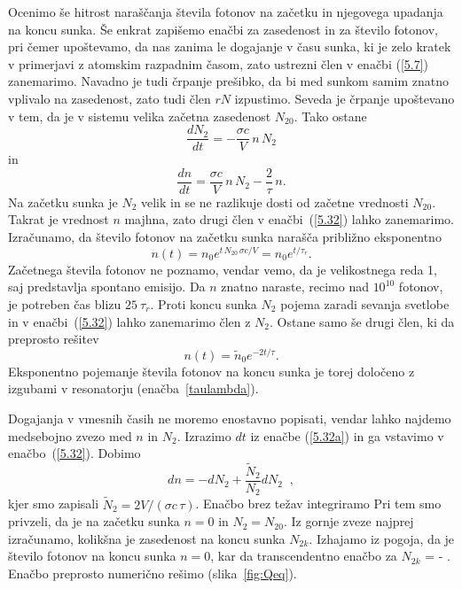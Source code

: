 Ocenimo še hitrost naraščanja števila fotonov na začetku in 
njegovega upadanja na koncu sunka. Še enkrat zapišemo enačbi za zasedenost in za število
fotonov, pri čemer upoštevamo, da nas zanima le dogajanje v času sunka,
ki je zelo kratek v primerjavi z atomskim razpadnim časom, zato 
ustrezni člen v enačbi (\ref{5.7}) zanemarimo. Navadno je tudi črpanje prešibko, da
bi med sunkom samim znatno vplivalo na zasedenost, zato tudi člen $rN$
izpustimo. Seveda je črpanje upoštevano v tem, da je v sistemu velika začetna 
zasedenost $N_{20}$. Tako ostane 
\begin{equation}
 \frac{d N_2}{d t}=-\frac{\sigma c}{V}\,n\,N_2 
 \label{5.32a}
\end{equation}
in 
\begin{equation}
 \frac{d n}{d t}=\frac{\sigma c}{V}\,n\,N_2 - \frac{2}{\tau}\,n.
 \label{5.32}
\end{equation}
Na začetku sunka je $N_2$ velik in se ne razlikuje dosti od začetne vrednosti $N_{20}$. Takrat 
je vrednost  $n$ majhna, zato drugi člen v enačbi~(\ref{5.32}) lahko  
zanemarimo. Izračunamo, da število fotonov
na začetku sunka narašča približno eksponentno
\begin{equation}  
n(t)=n_0e^{t\,N_{20}\,\sigma c/V}= n_0e^{t/\tau_r}.
\label{5.33}
\end{equation}
Začetnega števila fotonov ne poznamo, vendar vemo, da je velikostnega reda 1,
saj predstavlja spontano emisijo. Da $n$ znatno naraste, recimo nad 
$10^{10}$ fotonov, je potreben čas blizu $25~\tau_r$.
Proti koncu sunka $N_2$ pojema zaradi sevanja svetlobe in v enačbi~(\ref{5.32}) lahko 
zanemarimo člen z $N_2$. Ostane samo še drugi člen, ki da preprosto rešitev
\begin{equation}  
n(t)=\tilde{n}_0e^{-2t/\tau}.
\label{5.33a}
\end{equation}
Eksponentno pojemanje števila fotonov na koncu sunka je torej določeno z izgubami
v resonatorju (enačba~\ref{taulambda}). 

Dogajanja v vmesnih časih ne moremo enostavno popisati, vendar lahko najdemo
medsebojno zvezo med $n$ in $N_2$. 
Izrazimo $dt$ iz enačbe (\ref{5.32a}) in ga vstavimo v enačbo~(\ref{5.32}).
Dobimo
\begin{equation}
dn=-dN_{2}+\frac{\tilde{N}_2}{N_{2}}dN_{2}\;\;,  \label{5.341}
\end{equation}
kjer smo zapisali $\tilde{N}_{2}=2V/(\sigma c\,\tau)$.
Enačbo brez težav integriramo
Pri tem smo privzeli, da je na začetku sunka $n=0$ in $N_{2}=N_{20}$. 
Iz gornje zveze najprej izračunamo, kolikšna je zasedenost na koncu sunka 
$N_{2k}$. Izhajamo iz pogoja, da je število fotonov na koncu sunka $n=0$, 
kar da transcendentno enačbo za $N_{2k}$
\beq
\ln {} = - .
\label{xaenacba}
\eeq
Enačbo preprosto numerično rešimo (slika~\ref{fig:Qeq}).

